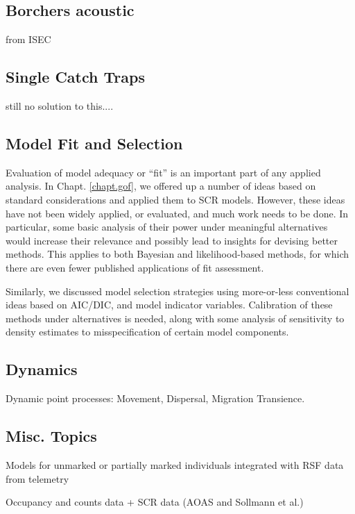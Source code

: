 \subsection{Borchers acoustic}

from ISEC

\subsection{Single Catch Traps}

still no solution to this....

\subsection{Model Fit and Selection}

Evaluation of model adequacy or ``fit'' is an important part of any
applied analysis. In Chapt. \ref{chapt.gof}, we offered up a number of
ideas based on standard considerations and applied them to SCR
models.  However, these ideas have not been widely applied, or evaluated, and much
work needs to be done. In particular, some basic analysis of their
power under meaningful alternatives would increase their relevance and
possibly lead to insights for devising better methods. This applies to
both Bayesian and likelihood-based methods, for which there are even
fewer published applications of fit assessment.

Similarly, we discussed model selection strategies using more-or-less
conventional ideas based on AIC/DIC, and model indicator
variables. Calibration of these methods under alternatives is needed,
along with 
some analysis of sensitivity to density estimates to misspecification
of certain model components.



\subsection{Dynamics}

Dynamic point processes:
Movement, Dispersal, Migration
Transience.


\subsection{Misc. Topics}

Models for unmarked or partially marked individuals integrated with RSF data from telemetry

Occupancy and counts data + SCR data (AOAS and Sollmann et al.)

